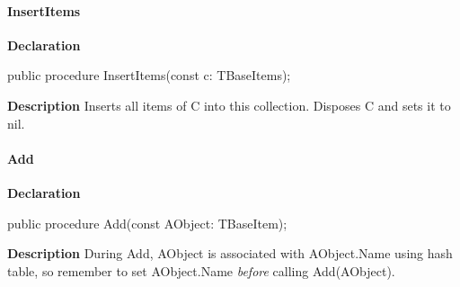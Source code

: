 \documentclass{report}
\newif\ifpdf
\begin{document}
\paragraph*{InsertItems}\hspace*{\fill}

\label{PasDoc_Items.TBaseItems-InsertItems}
\begin{list}{}{
\setlength{\itemindent}{0cm}
\setlength{\listparindent}{0cm}
\setlength{\leftmargin}{\evensidemargin}
\addtolength{\leftmargin}{\tmplength}
\settowidth{\labelsep}{X}
\addtolength{\leftmargin}{\labelsep}
\setlength{\labelwidth}{\tmplength}
}
\item[\textbf{Declaration}\hfill]
\ifpdf
\begin{flushleft}
\fi
\begin{ttfamily}
public procedure InsertItems(const c: TBaseItems);\end{ttfamily}

\ifpdf
\end{flushleft}
\fi

\par
\item[\textbf{Description}]
Inserts all items of C into this collection. Disposes C and sets it to nil.

\end{list}
\paragraph*{Add}\hspace*{\fill}

\label{PasDoc_Items.TBaseItems-Add}
\begin{list}{}{
\setlength{\itemindent}{0cm}
\setlength{\listparindent}{0cm}
\setlength{\leftmargin}{\evensidemargin}
\addtolength{\leftmargin}{\tmplength}
\settowidth{\labelsep}{X}
\addtolength{\leftmargin}{\labelsep}
\setlength{\labelwidth}{\tmplength}
}
\item[\textbf{Declaration}\hfill]
\ifpdf
\begin{flushleft}
\fi
\begin{ttfamily}
public procedure Add(const AObject: TBaseItem);\end{ttfamily}

\ifpdf
\end{flushleft}
\fi

\par
\item[\textbf{Description}]
During Add, AObject is associated with AObject.Name using hash table, so remember to set AObject.Name \textit{before} calling Add(AObject).

\end{list}
\end{document}
